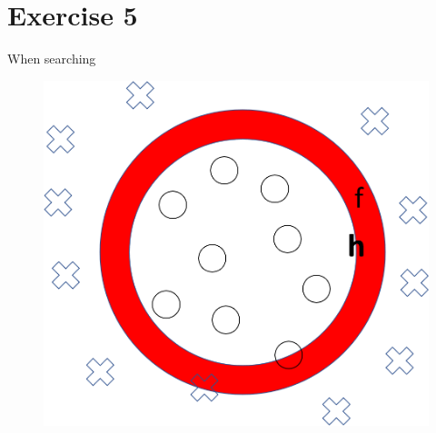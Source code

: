 \documentclass[12pt]{article}
\begin{document}
\section*{Exercise 5}

When searching 

\begin{figure}
	\centering
	\includegraphics[width=0.7\linewidth]{Bild1}
	\caption{}
\end{figure}
\end{document}
